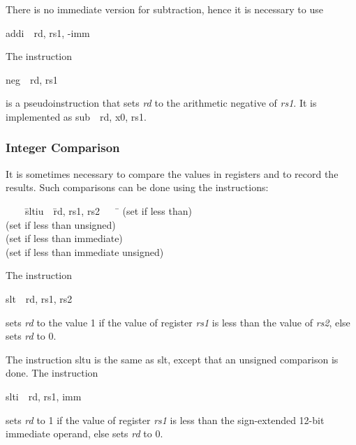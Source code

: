 \documentclass[11pt, twoside, pdftex]{article}
\newenvironment{ctabbing}%
{\begin{center}\begin{minipage}{\textwidth}\begin{tabbing}}
{\end{tabbing}\end{minipage}\end{center}}
\begin{document}
\noindent
There is no immediate version for subtraction, hence it is necessary to use 
\begin{center}
{\sf addi~~rd, rs1, -imm}
\end{center}
\vspace{-\baselineskip}
\noindent
The instruction
\vspace{-\baselineskip}
\begin{center}
{\sf neg~~rd, rs1}
\end{center}
\noindent
is a pseudoinstruction that sets {\it rd} to the arithmetic negative of {\it rs1}. It is
implemented as {\sf sub~~rd, x0, rs1}.

\subsubsection{Integer Comparison}
\label{sec:compare}

It is sometimes necessary to compare the values in registers and to record the results.
Such comparisons can be done using the instructions: 
\vspace{-\baselineskip}
\begin{ctabbing}
~~~~\={\sf sltiu}~~\={\sf rd, rs1, rs2}~~~~\=\kill
{}  \>(set if less than)\\
  \>(set if less than unsigned)\\
  \>(set if less than immediate)\\
  \>(set if less than immediate unsigned)
\end{ctabbing}

\noindent
The instruction
\vspace{-\baselineskip}
\begin{center}
{\sf slt~~rd, rs1, rs2}
\end{center}
\noindent
sets {\it rd} to the value 1 if the value of register {\it rs1} is less than the
value of {\it rs2}, else sets {\it rd} to 0.

The instruction {\sf sltu} is the same as {\sf slt}, except that an unsigned comparison is done. 
\newpage
\noindent
The instruction
\vspace{-\baselineskip}
\begin{center}
{\sf slti~~rd, rs1, imm}
\end{center}
\noindent
sets {\it rd} to 1 if the value of register {\it rs1} is less than the sign-extended 12-bit
immediate operand, else sets {\it rd} to 0.
\end{document}
